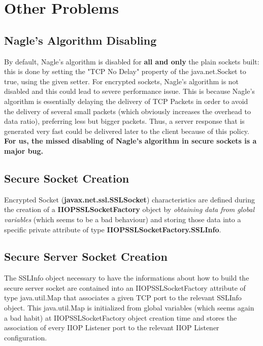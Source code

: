 \section{Other Problems}
\subsection{Nagle's Algorithm Disabling}
By default, Nagle's algorithm is disabled for \textbf{all and only} the plain sockets built: this is done by setting the "TCP No Delay" property of the java.net.Socket to true, using the given setter.
For encrypted sockets, Nagle's algorithm is not disabled and this could lead to severe performance issue.
This is because Nagle's algorithm is essentially delaying the delivery of TCP Packets in order to avoid the delivery of several small packets (which obviously increases the overhead to data ratio), preferring less but bigger packets.
Thus, a server response that is generated very fast could be delivered later to the client because of this policy.
\textbf{For us, the missed disabling of Nagle's algorithm in secure sockets is a major bug.}

\subsection{Secure Socket Creation}
Encrypted Socket (\textbf{javax.net.ssl.SSLSocket}) characteristics are defined during the creation of a \textbf{IIOPSSLSocketFactory} object by \textit{obtaining data from global variables} (which seems to be a bad behaviour) and storing those data into a specific private attribute of type \textbf{IIOPSSLSocketFactory.SSLInfo}.

\subsection{Secure Server Socket Creation}
The SSLInfo object necessary to have the informations about how to build the secure server socket are contained into an IIOPSSLSocketFactory attribute of type java.util.Map that associates a given TCP port to the relevant SSLInfo object.
This java.util.Map is initialized from global variables (which seems again a bad habit) at IIOPSSLSocketFactory object creation time and stores the association of every IIOP Listener port to the relevant IIOP Listener configuration.

